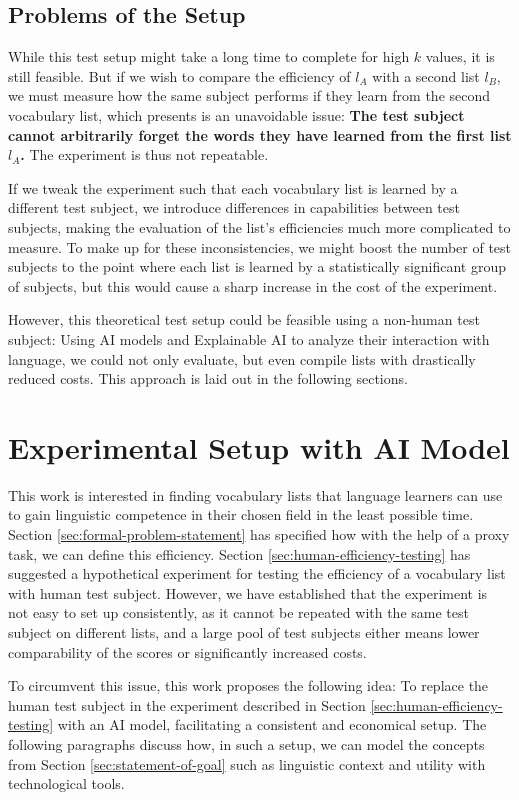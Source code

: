 \subsection{Problems of the Setup}
While this test setup might take a long time to complete for high $k$ values, it is still feasible.
But if we wish to compare the efficiency of $l_A$ with a second list $l_B$, we must measure how the same subject performs if they learn from the second vocabulary list, which presents is an unavoidable issue:
\textbf{The test subject cannot arbitrarily forget the words they have learned from the first list $l_A$.}
The experiment is thus not repeatable.

If we tweak the experiment such that each vocabulary list is learned by a different test subject, we introduce differences in capabilities between test subjects, making the evaluation of the list's efficiencies much more complicated to measure.
To make up for these inconsistencies, we might boost the number of test subjects to the point where each list is learned by a statistically significant group of subjects, but this would cause a sharp increase in the cost of the experiment.

However, this theoretical test setup could be feasible using a non-human test subject:
Using AI models and Explainable AI to analyze their interaction with language, we could not only evaluate, but even compile lists with drastically reduced costs.
This approach is laid out in the following sections.

\section{Experimental Setup with AI Model} \label{sec:experimental-setup-with-ai}
This work is interested in finding vocabulary lists that language learners can use to gain linguistic competence in their chosen field in the least possible time.
Section \ref{sec:formal-problem-statement} has specified how with the help of a proxy task, we can define this efficiency.
Section \ref{sec:human-efficiency-testing} has suggested a hypothetical experiment for testing the efficiency of a vocabulary list with human test subject.
However, we have established that the experiment is not easy to set up consistently, as it cannot be repeated with the same test subject on different lists, and a large pool of test subjects either means lower comparability of the scores or significantly increased costs.

To circumvent this issue, this work proposes the following idea:
To replace the human test subject in the experiment described in Section \ref{sec:human-efficiency-testing} with an AI model, facilitating a consistent and economical setup.
The following paragraphs discuss how, in such a setup, we can model the concepts from Section \ref{sec:statement-of-goal} such as linguistic context and utility with technological tools.

